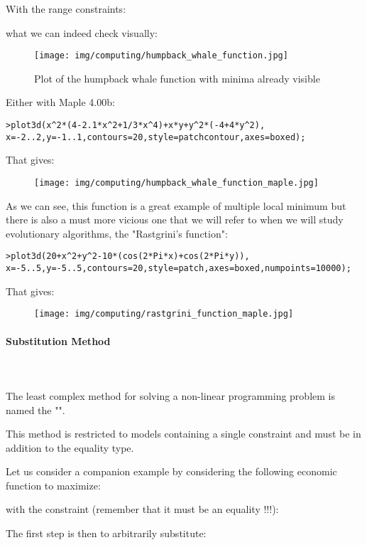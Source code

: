 	With the range constraints:
	
	what we can indeed check visually:
	\begin{figure}[H]
		\centering
		\texttt{[image: img/computing/humpback\_whale\_function.jpg]}
		\caption{Plot of the humpback whale function with minima already visible}
	\end{figure}
	Either with Maple 4.00b:
	
	\texttt{>plot3d(x\string^2*(4-2.1*x\string^2+1/3*x\string^4)+x*y+y\string^2*(-4+4*y\string^2),\\
 x=-2..2,y=-1..1,contours=20,style=patchcontour,axes=boxed);}

	That gives:
	\begin{figure}[H]
		\centering
		\texttt{[image: img/computing/humpback\_whale\_function\_maple.jpg]}
	\end{figure}

	As we can see, this function is a great example of multiple local minimum but there is also a must more vicious one that we will refer to when we will study evolutionary algorithms, the "Rastgrini's function":
	
	\texttt{>plot3d(20+x\string^2+y\string^2-10*(cos(2*Pi*x)+cos(2*Pi*y)),\\ 	x=-5..5,y=-5..5,contours=20,style=patch,axes=boxed,numpoints=10000);}
	
	That gives:
	\begin{figure}[H]
		\centering
		\texttt{[image: img/computing/rastgrini\_function\_maple.jpg]}
	\end{figure}
	
	\paragraph{Substitution Method}\mbox{}\\\\
	The least complex method for solving a non-linear programming problem is named the "".

	This method is restricted to models containing a single constraint and must be in addition to the equality type.

	Let us consider a companion example by considering the following economic function to maximize:
	
 	with the constraint (remember that it must be an equality !!!):
	
 	The first step is then to arbitrarily substitute:
	
